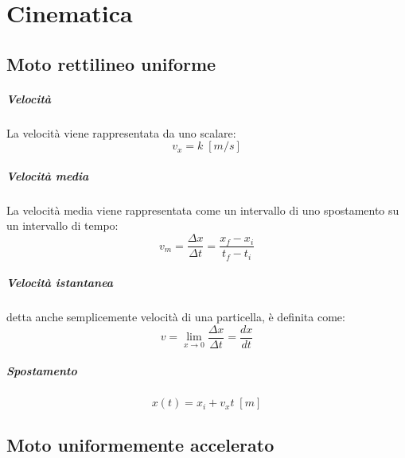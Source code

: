 \chapter{Cinematica}

    \section{Moto rettilineo uniforme}

        \paragraph{Velocità} 
            La velocità viene rappresentata da uno scalare:
            \begin{equation}
                v_x = k \; [m/s]
            \end{equation}

        \paragraph{Velocità media} 
            La velocità media viene rappresentata come un intervallo di uno 
            spostamento su un intervallo di tempo:
            \begin{equation}
                v_m = \frac{\Delta x}{\Delta t} = \frac{x_f - x_i}{t_f - t_i}
            \end{equation}

        \paragraph{Velocità istantanea} detta anche semplicemente velocità di 
        una particella, è definita come:
            \begin{equation}
                v = \lim_{x \to 0}  \frac{\Delta x}{\Delta t} = \frac{dx}{dt}
            \end{equation}

        \paragraph{Spostamento}
            \begin{equation}
                x(t) = x_i + v_xt \; [m]
            \end{equation}

    \section{Moto uniformemente accelerato}

